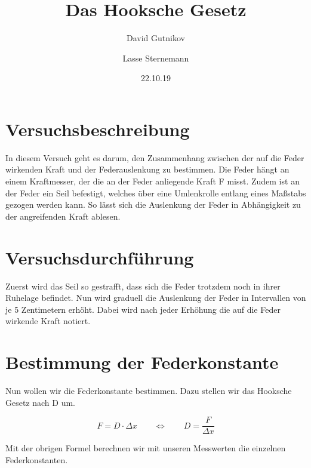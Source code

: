 \documentclass[titlepage = firstcover]{scrartcl}
\title{Das Hooksche Gesetz}
\author{David Gutnikov \and Lasse Sternemann}
\date{22.10.19}
\begin{document}
    \maketitle


    \section{Versuchsbeschreibung}
        In diesem Versuch geht es darum, den Zusammenhang zwischen der auf die Feder wirkenden Kraft und der Federauslenkung zu bestimmen.
        Die Feder hängt an einem Kraftmesser, der die an der Feder anliegende Kraft F misst. Zudem ist an der Feder ein Seil befestigt, 
        welches über eine Umlenkrolle entlang eines Maßstabs gezogen werden kann. So lässt sich die Auslenkung der Feder in Abhängigkeit zu
        der angreifenden Kraft ablesen.

    \section{Versuchsdurchführung}
        Zuerst wird das Seil so gestrafft, dass sich die Feder trotzdem noch in ihrer Ruhelage befindet. Nun wird graduell die Auslenkung der 
        Feder in Intervallen von je 5 Zentimetern erhöht. Dabei wird nach jeder Erhöhung die auf die Feder wirkende Kraft notiert.

        
    \section{Bestimmung der Federkonstante}
        Nun wollen wir die Federkonstante bestimmen. Dazu stellen wir das Hooksche Gesetz nach D um.

    \begin{equation}
        F = D \cdot \Delta x  \qquad \Leftrightarrow  \qquad D = \frac{F}{\Delta x}
    \end{equation} 



      Mit der obrigen Formel berechnen wir mit unseren Messwerten die einzelnen Federkonstanten. 
\end{document}
